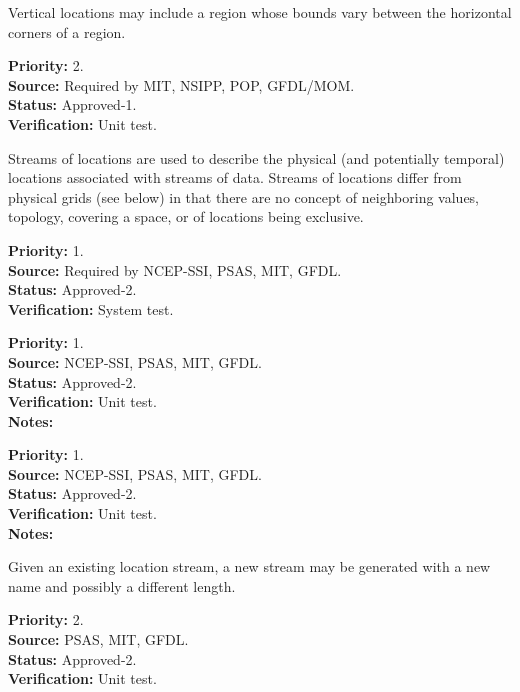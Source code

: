 
  Vertical locations may include a region whose bounds vary between the
horizontal corners of a region.
\begin{reqlist}
{\bf Priority:} 2. \\
{\bf Source:} Required by MIT, NSIPP, POP, GFDL/MOM. \\
{\bf Status:} Approved-1. \\
{\bf Verification:} Unit test.
\end{reqlist}


Streams of locations are used to describe the physical (and potentially temporal)
locations associated with streams of data.  Streams of locations differ from
physical grids (see below) in that there are no concept of neighboring values,
topology, covering a space, or of locations being exclusive.
\begin{reqlist}
{\bf Priority:} 1. \\
{\bf Source:} Required by NCEP-SSI, PSAS, MIT, GFDL. \\
{\bf Status:} Approved-2. \\
{\bf Verification:} System test.
\end{reqlist}

\begin{reqlist}
{\bf Priority:} 1. \\
{\bf Source:} NCEP-SSI, PSAS, MIT, GFDL. \\
{\bf Status:} Approved-2. \\
{\bf Verification:} Unit test. \\
{\bf Notes:} 
\end{reqlist}

\begin{reqlist}
{\bf Priority:} 1. \\
{\bf Source:} NCEP-SSI, PSAS, MIT, GFDL. \\
{\bf Status:} Approved-2. \\
{\bf Verification:} Unit test. \\
{\bf Notes:} 
\end{reqlist}

Given an existing location stream, a new stream may be generated with a new name and
possibly a different length.
\begin{reqlist}
{\bf Priority:} 2. \\
{\bf Source:} PSAS, MIT, GFDL.\\
{\bf Status:} Approved-2. \\
{\bf Verification:} Unit test.
\end{reqlist}

